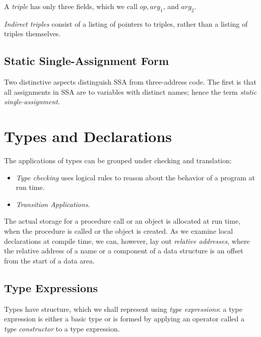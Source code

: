 \documentclass[12pt,a4paper,twoside,openany]{book}
\begin{document}
A \textit{triple} has only three fields, which we call $op,arg_1$, and $arg_2$.

\textit{Indirect triples} consist of a listing of pointers to triples, rather than a listing of triples themselves.

\subsection{Static Single-Assignment Form}

Two distinctive aspects distinguish SSA from three-address code. The first is that all assignments in SSA are to variables with distinct names; hence the term \textit{static single-assignment}.

\section{Types and Declarations}

The applications of types can be grouped under checking and translation:
\begin{itemize}
    \item \textit{Type checking} uses logical rules to reason about the behavior of a program at run time.
    \item \textit{Transition Applications}.
\end{itemize}

The actual storage for a procedure call or an object is allocated at run time, when the procedure is called or the object is created. As we examine local declarations at compile time, we can, however, lay out \textit{relative addresses}, where the relative address of a name or a component of a data structure is an offset from the start of a data area.

\subsection{Type Expressions}

Types have structure, which we shall represent using \textit{type expressions}: a type expression is either a basic type or is formed by applying an operator called a \textit{type constructor} to a type expression.
\end{document}
